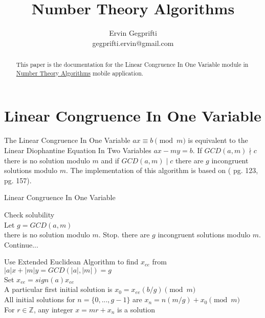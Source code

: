 \documentclass[12pt,oneside,a4paper]{article}
\title{Number Theory Algorithms}
\author{Ervin Gegprifti \\ [6pt]
	gegprifti.ervin@gmail.com}
\date{}
\begin{document}
\pagecolor{bgcolor}

\maketitle

\begin{abstract}
	This paper is the documentation for the Linear Congruence In One Variable module in \href{https://play.google.com/store/apps/details?id=com.gegprifti.android.numbertheoryalgorithms}{Number Theory Algorithms} mobile application.
\end{abstract}

\section*{Linear Congruence In One Variable}	
The Linear Congruence In One Variable $ax \equiv b \pmod{m}$ is equivalent to the Linear Diophantine Equation In Two Variables $ax-my=b$. If $GCD(a,m) \nmid c$ there is no solution modulo $m$ and if $GCD(a,m) \mid c$ there are $g$ incongruent solutions modulo $m$. The implementation of this algorithm is based on (\cite{yan2002number} pg. 123, \cite{rosen2011elementary} pg. 157). \\


\begin{algorithm}[H]
	\caption{Linear Congruence In One Variable}
	\DontPrintSemicolon
	\SetAlgoLined
	
	\BlankLine
	
	Check solubility \\
	Let $g=GCD(a,m)$ \\
	 { there is no solution modulo $m$. Stop. }
	 { there are $g$ incongruent solutions modulo $m$. Continue... }
	
	Use Extended Euclidean Algorithm to find $x_{ee}$ from $|a|x+|m|y=GCD(|a|,|m|)=g$ \\
	Set $x_{ee} = sign(a)x_{ee}$ \\
	A particular first initial solution is $x_0 = x_{ee}(b/g) \pmod{m}$ \\
	All initial solutions for $n = \lbrace0, ... ,g-1\rbrace$ are $x_n = n(m/g) + x_0 \pmod{m}$ \\
	For $r \in \mathbb{Z}$, any integer $x=mr+x_n$ is a solution \\
		
\end{algorithm}
\end{document}
